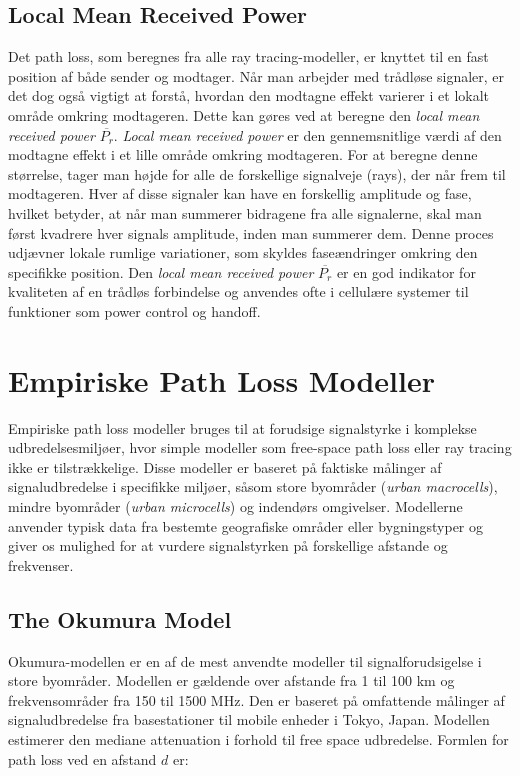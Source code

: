 \documentclass[a4paper,12pt]{book}
\begin{document}
	\subsection{Local Mean Received Power} Det path loss, som beregnes fra alle ray tracing-modeller, er knyttet til en fast position af både sender og modtager. Når man arbejder med trådløse signaler, er det dog også vigtigt at
	forstå, hvordan den modtagne effekt varierer i et lokalt område omkring modtageren. Dette kan gøres ved at beregne den \textit{local mean received power} \( \overline{P_r} \).
	\newline\newline
	\textit{Local mean received power} er den gennemsnitlige værdi af den modtagne effekt i et lille område omkring modtageren. For at beregne denne størrelse, tager man højde for alle de forskellige signalveje (rays), der når frem til modtageren. Hver af disse signaler kan have en forskellig amplitude og fase, hvilket betyder, at når man summerer bidragene fra alle signalerne, skal man først kvadrere hver signals amplitude, inden man summerer dem. Denne proces udjævner lokale rumlige variationer, som skyldes faseændringer omkring den specifikke position.
	\newline\newline
	Den \textit{local mean received power} \( \overline{P_r} \) er en god indikator for kvaliteten af en trådløs forbindelse og anvendes ofte i cellulære systemer til funktioner som power control og handoff.
	
	\section{Empiriske Path Loss Modeller}
	Empiriske path loss modeller bruges til at forudsige signalstyrke i komplekse udbredelsesmiljøer, hvor simple modeller som free-space path loss eller ray tracing ikke er tilstrækkelige. Disse modeller er baseret på faktiske målinger af signaludbredelse i specifikke miljøer, såsom store byområder (\textit{urban macrocells}), mindre byområder (\textit{urban microcells}) og indendørs omgivelser. Modellerne anvender typisk data fra bestemte geografiske områder eller bygningstyper og giver os mulighed for at vurdere signalstyrken på forskellige afstande og frekvenser.
	
	\subsection{The Okumura Model}
	Okumura-modellen er en af de mest anvendte modeller til signalforudsigelse i store byområder. Modellen er gældende over afstande fra 1 til 100 km og frekvensområder fra 150 til 1500 MHz. Den er baseret på omfattende målinger af signaludbredelse fra basestationer til mobile enheder i Tokyo, Japan. Modellen estimerer den mediane attenuation i forhold til free space udbredelse. Formlen for path loss ved en afstand \(d\) er:
	
\end{document}
